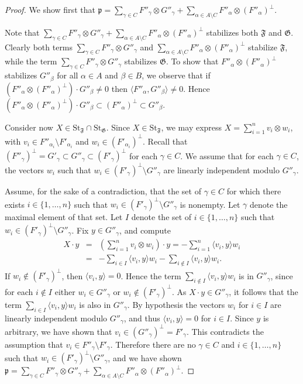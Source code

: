 \documentclass{article}
\newcommand {\St} {\mathrm{St}}
\def\p{\mathfrak {p}}
\def\F{\mathfrak{F}}
\def\G{\mathfrak{G}}
\begin{document}
\begin{proof} 
We show first that $\p = \sum_{\gamma \in C} F''_\gamma \otimes G''_\gamma + \sum_{\alpha \in A \setminus C} F''_\alpha \otimes (F''_\alpha)^\perp$.  

Note that $ \sum_{\gamma \in C} F''_\gamma \otimes G''_\gamma + \sum_{\alpha \in A \setminus C} F''_\alpha \otimes (F''_\alpha)^\perp$ stabilizes both $\F$ and $\G$.  
Clearly both terms $\sum_{\gamma \in C} F''_\gamma \otimes G''_\gamma$ and $\sum_{\alpha \in A \setminus C} F''_\alpha \otimes (F''_\alpha)^\perp$ stabilize $\F$, while the term $\sum_{\gamma \in C} F''_\gamma \otimes G''_\gamma$ stabilizes $\G$.  To show that $F''_\alpha \otimes (F''_\alpha)^\perp$ stabilizes $G''_\beta$ for all $\alpha \in A$ and $\beta \in B$, we observe that if $(F''_\alpha \otimes (F''_\alpha)^\perp) \cdot G''_\beta \neq 0$ then $\langle F''_\alpha , G''_\beta \rangle \neq 0$.  Hence $(F''_\alpha \otimes (F''_\alpha)^\perp) \cdot G''_\beta \subset (F''_\alpha)^\perp \subset G''_\beta$.

Consider now $X \in \St_\F \cap \St_\G$.  Since $X \in \St_\F$, we may express $X = \sum_{i=1}^n v_i \otimes w_i$, with $v_i \in F''_{\alpha_i} \setminus F'_{\alpha_i}$ and $w_i \in (F'_{\alpha_i})^\perp$.  Recall that $(F''_\gamma)^\perp = G'_\gamma \subset G''_\gamma \subset (F'_\gamma)^\perp$ for each $\gamma \in C$.  We assume that for each $\gamma \in C$, the vectors $w_i$ such that $w_i \in (F'_\gamma)^\perp \setminus G''_\gamma$ are linearly independent modulo $G''_\gamma$.  

Assume, for the sake of a contradiction, that the set of $\gamma \in C$ for which there exists $i \in \{1, \ldots , n\}$ such that $w_i \in (F'_\gamma)^\perp \setminus G''_\gamma$ is nonempty.  Let $\gamma$ denote the maximal element of that set.  Let $I$ denote the set of $i \in \{1 , \ldots , n \}$ such that $w_i \in (F'_\gamma)^\perp \setminus G''_\gamma$.  Fix $y \in G''_\gamma$, and compute
\begin{eqnarray*}
X \cdot y & = & (\sum_{i=1}^n v_i \otimes w_i) \cdot y 
 = - \sum_{i=1}^n \langle v_i , y \rangle w_i \\
& = & - \sum_{i \in I} \langle v_i , y \rangle w_i - \sum_{i \notin I} \langle v_i , y \rangle w_i .
\end{eqnarray*}
 If $w_i \notin (F'_\gamma)^\perp$, then $\langle v_i , y \rangle = 0$.  Hence the term $\sum_{i \notin I} \langle v_i , y \rangle w_i$
 is in $G''_\gamma$, since for each $i \notin I$ either $w_i \in G''_\gamma$ or $w_i \notin (F'_\gamma)^\perp$. 
 As $X \cdot y \in G''_\gamma$, it follows that the term $\sum_{i \in I} \langle v_i , y \rangle w_i$ is also in $G''_\gamma$.  By hypothesis the vectors $w_i$ for $i \in I$ are linearly independent modulo $G''_\gamma$, and thus $\langle v_i , y \rangle = 0$ for $i \in I$.  Since $y$ is arbitrary, we have shown that $v_i \in (G''_\gamma)^\perp = F'_\gamma$.  This contradicts the assumption that $v_i \in F''_\gamma \setminus F'_\gamma$. Therefore there are no $\gamma \in C$ and $i \in \{1, \ldots , n\}$ such that $w_i \in (F'_\gamma)^\perp \setminus G''_\gamma$, and we have shown $\p = \sum_{\gamma \in C} F''_\gamma \otimes G''_\gamma + \sum_{\alpha \in A \setminus C} F''_\alpha \otimes (F''_\alpha)^\perp$.


\end{proof}
\end{document}

